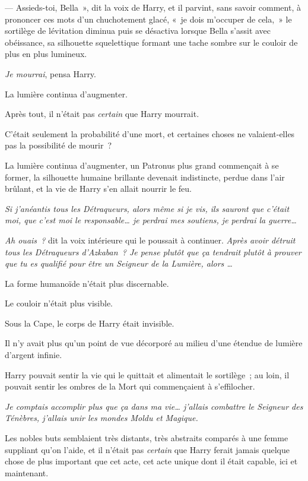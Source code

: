 --- Assieds-toi, Bella~», dit la voix de Harry, et il parvint, sans savoir comment, à prononcer ces mots d'un chuchotement glacé, «~je dois m'occuper de cela,~» le sortilège de lévitation diminua puis se désactiva lorsque Bella s'assit avec obéissance, sa silhouette squelettique formant une tache sombre sur le couloir de plus en plus lumineux.

\emph{Je mourrai}, pensa Harry.

La lumière continua d'augmenter.

Après tout, il n'était pas \emph{certain} que Harry mourrait.

C'était seulement la probabilité d'une mort, et certaines choses ne valaient-elles pas la possibilité de mourir~?

La lumière continua d'augmenter, un Patronus plus grand commençait à se former, la silhouette humaine brillante devenait indistincte, perdue dans l'air brûlant, et la vie de Harry s'en allait nourrir le feu.

\emph{Si j'anéantis tous les Détraqueurs, alors même si je vis, ils sauront que c'était moi, que c'est moi le responsable… je perdrai mes soutiens, je perdrai la guerre…}

\emph{Ah ouais~?} dit la voix intérieure qui le poussait à continuer.
\emph{Après avoir détruit tous les Détraqueurs d'Azkaban~?
Je pense plutôt que ça tendrait plutôt à prouver que tu es qualifié pour être un Seigneur de la Lumière, alors …}

La forme humanoïde n'était plus discernable.

Le couloir n'était plus visible.

Sous la Cape, le corps de Harry était invisible.

Il n'y avait plus qu'un point de vue décorporé au milieu d'une étendue de lumière d'argent infinie.

Harry pouvait sentir la vie qui le quittait et alimentait le sortilège~; au loin, il pouvait sentir les ombres de la Mort qui commençaient à s'effilocher.

\emph{Je comptais accomplir plus que ça dans ma vie… j'allais combattre le Seigneur des Ténèbres, j'allais unir les mondes Moldu et Magique.}

Les nobles buts semblaient très distants, très abstraits comparés à une femme suppliant qu'on l'aide, et il n'était pas \emph{certain} que Harry ferait jamais quelque chose de plus important que cet acte, cet acte unique dont il était capable, ici et maintenant.

